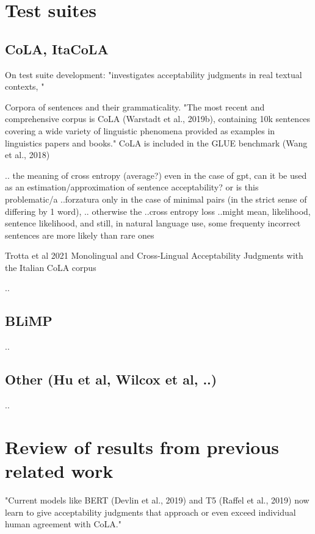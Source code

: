 \section{Test suites}
\subsection{CoLA, ItaCoLA}

On test suite development:
"investigates acceptability judgments in real textual contexts, " \citep{lau2020furiously} 


Corpora of sentences and their grammaticality. "The most recent
and comprehensive corpus is CoLA (Warstadt et al., 2019b), containing 10k sentences covering a wide variety of linguistic phenomena provided as examples in linguistics papers and books."\citep{warstadt2020blimp}	
CoLA is included in the GLUE benchmark (Wang et al., 2018)

..
the meaning of cross entropy (average?)
even in the case of gpt, can it be used as an estimation/approximation of sentence acceptability?
or is this problematic/a ..forzatura
only in the case of minimal pairs (in the strict sense of differing by 1 word), ..
otherwise the ..cross entropy loss ..might mean, likelihood, sentence likelihood, and still, in natural language use, some frequenty incorrect sentences are more likely than rare ones

Trotta et al 2021 Monolingual and Cross-Lingual Acceptability Judgments with the Italian CoLA corpus

..

\subsection{BLiMP}
..
\subsection{Other (Hu et al, Wilcox et al, ..)}
..


\section{Review of results from previous related work}

"Current models like BERT (Devlin et al., 2019) and T5 (Raffel et al., 2019) now learn to give acceptability judgments that approach or even exceed individual human agreement with CoLA." \citep{warstadt2020blimp}	

